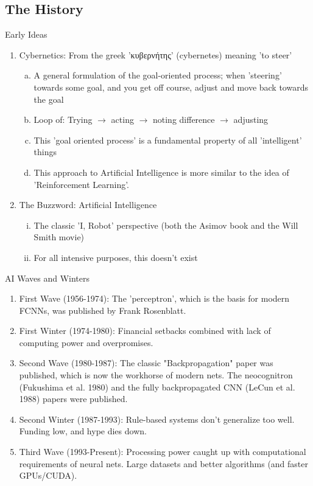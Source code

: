 \documentclass{beamer}
\begin{document}
\subsection{The History}
\begin{frame}{Early Ideas}
    \begin{enumerate}[1.]
        \item Cybernetics: From the greek \textgreek{'κυβερνήτης'} (cybernetes) meaning 'to steer' 
        \begin{enumerate}[a.]
            \item A general formulation of the goal-oriented process; when 'steering' towards some goal, and you get off course, adjust and move back towards the goal
            \item Loop of: Trying $\rightarrow$ acting $\rightarrow$ noting difference $\rightarrow$ adjusting
            \item This 'goal oriented process' is a fundamental property of all 'intelligent' things
            \item This approach to Artificial Intelligence is more similar to the idea of 'Reinforcement Learning'.
        \end{enumerate}
        \item The Buzzword: Artificial Intelligence
        \begin{enumerate}[i.]
            \item The classic 'I, Robot' perspective (both the Asimov book and the Will Smith movie)
            \item For all intensive purposes, this doesn't exist 
        \end{enumerate}
    \end{enumerate}
\end{frame}
\begin{frame}{AI Waves and Winters}
        \begin{enumerate}[1.]
            \item First Wave (1956-1974): The 'perceptron', which is the basis for modern FCNNs, was published by Frank Rosenblatt.
            \item First Winter (1974-1980): Financial setbacks combined with lack of computing power and overpromises.
            \item Second Wave (1980-1987): The classic "Backpropagation" paper was published, which is now the workhorse of modern nets. The neocognitron (Fukushima et al. 1980) and the fully backpropagated CNN (LeCun et al. 1988) papers were published.
            \item Second Winter (1987-1993): Rule-based systems don't generalize too well. Funding low, and hype dies down.
            \item Third Wave (1993-Present): Processing power caught up with computational requirements of neural nets. Large datasets and better algorithms (and faster GPUs/CUDA).
        \end{enumerate}
\end{frame}
\end{document}
